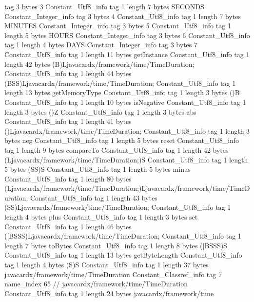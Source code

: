 {{{			tag	3
			bytes	3
		}
		Constant_Utf8_info {
			tag	1
			length	7
			bytes	SECONDS
		}
		Constant_Integer_info {
			tag	3
			bytes	4
		}
		Constant_Utf8_info {
			tag	1
			length	7
			bytes	MINUTES
		}
		Constant_Integer_info {
			tag	3
			bytes	5
		}
		Constant_Utf8_info {
			tag	1
			length	5
			bytes	HOURS
		}
		Constant_Integer_info {
			tag	3
			bytes	6
		}
		Constant_Utf8_info {
			tag	1
			length	4
			bytes	DAYS
		}
		Constant_Integer_info {
			tag	3
			bytes	7
		}
		Constant_Utf8_info {
			tag	1
			length	11
			bytes	getInstance
		}
		Constant_Utf8_info {
			tag	1
			length	42
			bytes	(B)Ljavacardx/framework/time/TimeDuration;
		}
		Constant_Utf8_info {
			tag	1
			length	44
			bytes	(BSS)Ljavacardx/framework/time/TimeDuration;
		}
		Constant_Utf8_info {
			tag	1
			length	13
			bytes	getMemoryType
		}
		Constant_Utf8_info {
			tag	1
			length	3
			bytes	()B
		}
		Constant_Utf8_info {
			tag	1
			length	10
			bytes	isNegative
		}
		Constant_Utf8_info {
			tag	1
			length	3
			bytes	()Z
		}
		Constant_Utf8_info {
			tag	1
			length	3
			bytes	abs
		}
		Constant_Utf8_info {
			tag	1
			length	41
			bytes	()Ljavacardx/framework/time/TimeDuration;
		}
		Constant_Utf8_info {
			tag	1
			length	3
			bytes	neg
		}
		Constant_Utf8_info {
			tag	1
			length	5
			bytes	reset
		}
		Constant_Utf8_info {
			tag	1
			length	9
			bytes	compareTo
		}
		Constant_Utf8_info {
			tag	1
			length	42
			bytes	(Ljavacardx/framework/time/TimeDuration;)S
		}
		Constant_Utf8_info {
			tag	1
			length	5
			bytes	(SS)S
		}
		Constant_Utf8_info {
			tag	1
			length	5
			bytes	minus
		}
		Constant_Utf8_info {
			tag	1
			length	80
			bytes	(Ljavacardx/framework/time/TimeDuration;)Ljavacardx/framework/time/TimeDuration;
		}
		Constant_Utf8_info {
			tag	1
			length	43
			bytes	(SS)Ljavacardx/framework/time/TimeDuration;
		}
		Constant_Utf8_info {
			tag	1
			length	4
			bytes	plus
		}
		Constant_Utf8_info {
			tag	1
			length	3
			bytes	set
		}
		Constant_Utf8_info {
			tag	1
			length	46
			bytes	([BSSS)Ljavacardx/framework/time/TimeDuration;
		}
		Constant_Utf8_info {
			tag	1
			length	7
			bytes	toBytes
		}
		Constant_Utf8_info {
			tag	1
			length	8
			bytes	([BSSS)S
		}
		Constant_Utf8_info {
			tag	1
			length	13
			bytes	getByteLength
		}
		Constant_Utf8_info {
			tag	1
			length	4
			bytes	(S)S
		}
		Constant_Utf8_info {
			tag	1
			length	37
			bytes	javacardx/framework/time/TimeDuration
		}
		Constant_Classref_info {
			tag	7
			name_index	65		// javacardx/framework/time/TimeDuration
		}
		Constant_Utf8_info {
			tag	1
			length	24
			bytes	javacardx/framework/time
}}}
